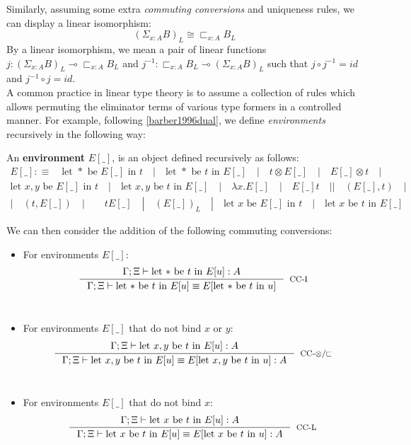 Similarly, assuming some extra \textit{commuting conversions} and uniqueness rules, we can display a linear isomorphism:
\[
  (\Sigma_{x : A}B)_L \cong \sqsubset_{x : A}B_L
\]
By a linear isomorphism, we mean a pair of linear functions $j : (\Sigma_{x : A}B)_L \multimap \sqsubset_{x : A}B_L$ and $j^{-1} : \sqsubset_{x : A}B_L \multimap (\Sigma_{x :A}B)_L$ such that $j \circ j^{-1} = id$ and $j^{-1} \circ j = id$.\\
A common practice in linear type theory is to assume a collection of rules which allows permuting the eliminator terms of various type formers in a controlled manner. For example, following \ref{barber1996dual}, we define \textit{environments} recursively in the following way:
\begin{defn}
  An \textbf{environment} $E[\_]$, is an object defined recursively as follows:
  \[
    \begin{split}
    E[\_] :\equiv \quad  \text{let $*$ be $E[\_]$ in $t$} \quad | \quad \text{let $*$ be $t$ in $E[\_]$} \quad | \quad t \otimes E[\_] \quad | \quad  E[\_]\otimes t \quad  |\\
    \text{let $x, y$ be $E[\_]$ in $t$} \quad  | \quad  \text{let $x, y$ be $t$ in $E[\_]$} \quad | \quad \lambda x.E[\_] \quad | \quad E[\_]t \quad | | \quad (E[\_], t) \quad | \\
   | \quad (t, E[\_]) \quad |  \quad  \quad tE[\_] \quad | \quad (E[\_])_L \quad  | \quad \text{let $x$ be $E[\_]$ in $t$} \quad | \quad \text{let $x$ be $t$ in $E[\_]$}
    \end{split}
  \]
\end{defn}
We can then consider the addition of the following commuting conversions:
\begin{itemize}
  \item For environments $E[\_]$:
\[
  \inference{\Gamma; \Xi \vdash \text{let $*$ be $t$ in $E[u]$} : A}
  {\Gamma; \Xi \vdash \text{let $*$ be $t$ in $E[u]$} \equiv E[\text{let $*$ be $t$ in $u$}]}[CC-I]
\]\\
  \item For environments $E[\_]$ that do not bind $x$ or $y$:
\[
  \inference{\Gamma; \Xi \vdash \text{let $x, y$ be $t$ in $E[u]$} :A }
  {\Gamma; \Xi \vdash \text{let $x,y$ be $t$ in $E[u]$} \equiv E[\text{let $x,y$ be $t$ in $u$}] : A}[CC-$\otimes$/$\sqsubset$]
\]\\
  \item For environments $E[\_]$ that do not bind $x$:
\[
  \inference{\Gamma; \Xi \vdash \text{let $x$ be $t$ in $E[u]$} :A }
  {\Gamma; \Xi \vdash \text{let $x$ be $t$ in $E[u]$} \equiv E[\text{let $x$ be $t$ in $u$}] : A}[CC-L]
\]
\end{itemize}
